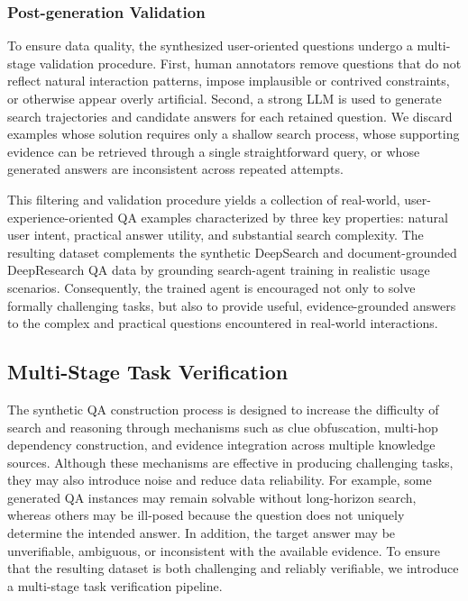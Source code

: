 \documentclass{huawei}
\begin{document}
\subsubsection{Post-generation Validation}
To ensure data quality, the synthesized user-oriented questions undergo a multi-stage validation procedure. First, human annotators remove questions that do not reflect natural interaction patterns, impose implausible or contrived constraints, or otherwise appear overly artificial. Second, a strong LLM is used to generate search trajectories and candidate answers for each retained question. We discard examples whose solution requires only a shallow search process, whose supporting evidence can be retrieved through a single straightforward query, or whose generated answers are inconsistent across repeated attempts.



This filtering and validation procedure yields a collection of real-world, user-experience-oriented QA examples characterized by three key properties: natural user intent, practical answer utility, and substantial search complexity. The resulting dataset complements the synthetic DeepSearch and document-grounded DeepResearch QA data by grounding search-agent training in realistic usage scenarios. Consequently, the trained agent is encouraged not only to solve formally challenging tasks, but also to provide useful, evidence-grounded answers to the complex and practical questions encountered in real-world interactions.


\subsection{Multi-Stage Task Verification}
The synthetic QA construction process is designed to increase the difficulty of search and reasoning through mechanisms such as clue obfuscation, multi-hop dependency construction, and evidence integration across multiple knowledge sources. Although these mechanisms are effective in producing challenging tasks, they may also introduce noise and reduce data reliability. For example, some generated QA instances may remain solvable without long-horizon search, whereas others may be ill-posed because the question does not uniquely determine the intended answer. In addition, the target answer may be unverifiable, ambiguous, or inconsistent with the available evidence. To ensure that the resulting dataset is both challenging and reliably verifiable, we introduce a multi-stage task verification pipeline.
\end{document}
